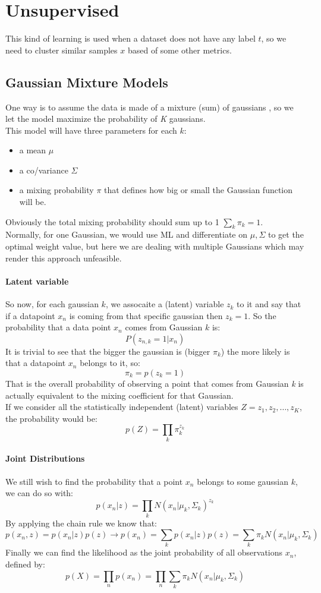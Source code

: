 \section{Unsupervised}
This kind of learning is used when a dataset does not have any label $t$, so we need to cluster similar samples $x$ based of some other metrics.

\subsection{Gaussian Mixture Models }
One way is to assume the data is made of a mixture (sum) of gaussians , so we let the model maximize the probability of  \textit{K} gaussians.\\
This model will have three parameters for each $k$:
\begin{itemize}
\item a mean $\mu$
\item a co/variance $\Sigma$
\item a mixing probability $\pi$ that defines how big or small the Gaussian function will be. 
\end{itemize}
Obviously the total mixing probability should sum up to 1 $\sum_k \pi_k=1$.\\
Normally, for one Gaussian, we would use ML and differentiate on $\mu, \Sigma$ to get the optimal weight value, but here we are dealing with multiple Gaussians which may render this approach unfeasible.

\paragraph{Latent variable}

So now, for each gaussian $k$, we assocaite a (latent) variable $z_k$ to it and say that if a datapoint $x_n$ is coming from that specific gaussian then $z_k=1$. So the probability  that a data point $x_n$ comes from Gaussian $k$ is:
$$P(z_{n,k}=1|x_n)$$
It is trivial to see that the bigger the gaussian is (bigger $\pi_k$) the more likely is that a datapoint $x_n$ belongs to it, so:
$$\pi_k=p(z_k=1)$$
That is the  overall probability of observing a point that comes from Gaussian \textit{k} is actually equivalent to the mixing coefficient for that Gaussian.\\
If we consider all the statistically independent (latent) variables $Z=z_1,z_2,\dots, z_K$, the probability would be:
$$p(Z)=\prod_k \pi_k^{z_k}$$

\paragraph{Joint Distributions}
We still wish to find the probability that a point $x_n$ belongs to some gaussian $k$, we can do so with:
$$p(x_n|z)=\prod_k N(x_n|\mu_k,\Sigma_k)^{z_k}$$
By applying the chain rule we know that:
$$p(x_n,z)=p(x_n|z)p(z) \to p(x_n)=\sum_k p(x_n|z)p(z)= \sum_k \pi_k N(x_n|\mu_k,\Sigma_k)$$
Finally we  can find the likelihood as the joint probability of all observations $x_n$, defined by:
$$p(X)=\prod_n  p(x_n)=\prod_n \sum_k \pi_k N(x_n|\mu_k,\Sigma_k)$$

